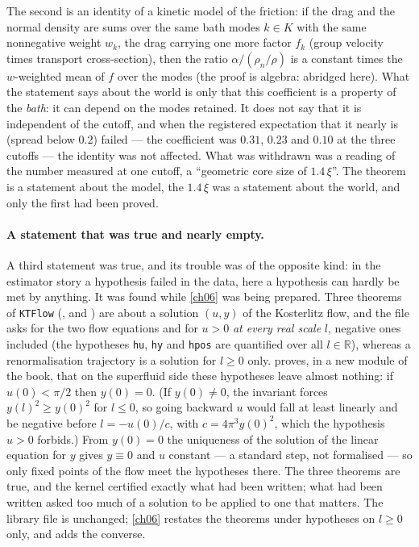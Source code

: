 \noindent The second is an identity of a kinetic model of the friction: if the drag and the normal density are sums over the same bath modes $k\in K$ with the
same nonnegative weight $w_k$, the drag carrying one more factor $f_k$ (group velocity times transport cross-section), then the ratio $\alpha/(\rho_n/\rho)$
is a constant times the $w$-weighted mean of $f$ over the modes (the proof is algebra: abridged here). What the statement says about the world is only
that this coefficient is a property of the \emph{bath}: it can depend on the modes retained. It does not say that it is independent of the cutoff, and when
the registered expectation that it nearly is (spread below $0.2$) failed --- the coefficient was $0.31$, $0.23$ and $0.10$ at the three cutoffs --- the
identity was not affected. What was withdrawn was a reading of the number measured at one cutoff, a ``geometric core size of $1.4\,\xi$''. The theorem
is a statement about the model, the $1.4\,\xi$ was a statement about the world, and only the first had been proved.

\paragraph{A statement that was true and nearly empty.} A third statement was true, and its trouble was of the opposite kind: in the estimator story a hypothesis failed in the data, here a hypothesis
can hardly be met by anything. It was found while \cref{ch06} was being prepared. Three theorems of \texttt{KTFlow} (,  and
) are about a solution $(u,y)$ of the Kosterlitz flow, and the file asks for the two flow equations and for $u>0$ \emph{at every real
scale} $l$, negative ones included (the hypotheses \texttt{hu}, \texttt{hy} and \texttt{hpos} are quantified over all $l\in\mathbb R$), whereas a renormalisation
trajectory is a solution for $l\ge0$ only.  proves, in a new module of the book, that on the superfluid side these hypotheses leave almost nothing: if
$u(0)<\pi/2$ then $y(0)=0$. (If $y(0)\neq0$, the invariant forces $y(l)^2\ge y(0)^2$ for $l\le0$, so going backward $u$ would fall at least linearly and be negative
before $l=-u(0)/c$, with $c=4\pi^3y(0)^2$, which the hypothesis $u>0$ forbids.) From $y(0)=0$ the uniqueness of the solution of the linear equation for $y$ gives
$y\equiv0$ and $u$ constant --- a standard step, not formalised --- so only fixed points of the flow meet the hypotheses there. The three theorems are true, and the
kernel certified exactly what had been written; what had been written asked too much of a solution to be applied to one that matters. The library file is unchanged; \cref{ch06} restates the theorems under hypotheses on
$l\ge0$ only, and adds the converse.

